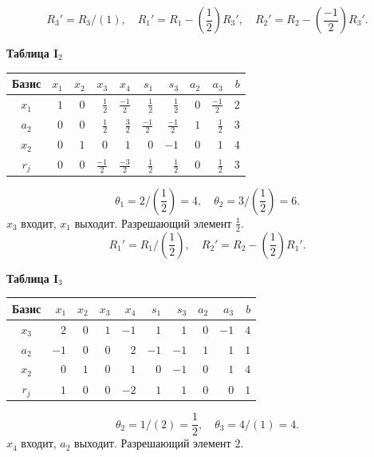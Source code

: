 \documentclass[12pt,a4paper]{article}
\begin{document}
\[R_{3}'=R_{3}/(1),\quad R_{1}'=R_{1}-(\frac{1}{2})R_{3}',\quad R_{2}'=R_{2}-(\frac{-1}{2})R_{3}'.\]
\par\textbf{Таблица I$_{2}$}\begin{center}\small\setlength{\tabcolsep}{4pt}\begin{tabular}{c|rrrrrrrr|r}\hline
Базис & $x_{1}$ & $x_{2}$ & \cellcolor{cyan!18}$x_{3}$ & $x_{4}$ & $s_{1}$ & $s_{3}$ & $a_{2}$ & $a_{3}$ & $b$\\\hline
\rowcolor{yellow!25}$x_{1}$ & $1$ & $0$ & \cellcolor{orange!45}$\frac{1}{2}$ & $\frac{-1}{2}$ & $\frac{1}{2}$ & $\frac{1}{2}$ & $0$ & $\frac{-1}{2}$ & $2$\\
$a_{2}$ & $0$ & $0$ & \cellcolor{cyan!18}$\frac{1}{2}$ & $\frac{3}{2}$ & $\frac{-1}{2}$ & $\frac{-1}{2}$ & $1$ & $\frac{1}{2}$ & $3$\\
$x_{2}$ & $0$ & $1$ & \cellcolor{cyan!18}$0$ & $1$ & $0$ & $-1$ & $0$ & $1$ & $4$\\
\hline $r_j$ & $0$ & $0$ & \cellcolor{cyan!18}$\frac{-1}{2}$ & $\frac{-3}{2}$ & $\frac{1}{2}$ & $\frac{1}{2}$ & $0$ & $\frac{1}{2}$ & $3$\\\hline\end{tabular}\end{center}
\[\theta_{1}=2/(\frac{1}{2})=4,\quad \theta_{2}=3/(\frac{1}{2})=6.\]
$x_{3}$ входит, $x_{1}$ выходит. Разрешающий элемент $\frac{1}{2}$.
\[R_{1}'=R_{1}/(\frac{1}{2}),\quad R_{2}'=R_{2}-(\frac{1}{2})R_{1}'.\]
\newpage
\par\textbf{Таблица I$_{3}$}\begin{center}\small\setlength{\tabcolsep}{4pt}\begin{tabular}{c|rrrrrrrr|r}\hline
Базис & $x_{1}$ & $x_{2}$ & $x_{3}$ & \cellcolor{cyan!18}$x_{4}$ & $s_{1}$ & $s_{3}$ & $a_{2}$ & $a_{3}$ & $b$\\\hline
$x_{3}$ & $2$ & $0$ & $1$ & \cellcolor{cyan!18}$-1$ & $1$ & $1$ & $0$ & $-1$ & $4$\\
\rowcolor{yellow!25}$a_{2}$ & $-1$ & $0$ & $0$ & \cellcolor{orange!45}$2$ & $-1$ & $-1$ & $1$ & $1$ & $1$\\
$x_{2}$ & $0$ & $1$ & $0$ & \cellcolor{cyan!18}$1$ & $0$ & $-1$ & $0$ & $1$ & $4$\\
\hline $r_j$ & $1$ & $0$ & $0$ & \cellcolor{cyan!18}$-2$ & $1$ & $1$ & $0$ & $0$ & $1$\\\hline\end{tabular}\end{center}
\[\theta_{2}=1/(2)=\frac{1}{2},\quad \theta_{3}=4/(1)=4.\]
$x_{4}$ входит, $a_{2}$ выходит. Разрешающий элемент $2$.
\end{document}

